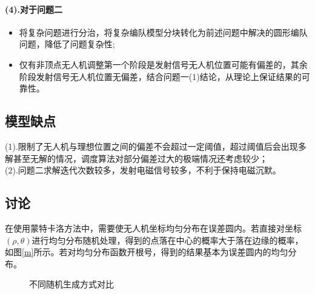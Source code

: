 \documentclass[withoutpreface,bwprint]{cumcmthesis} %
\begin{document}
	\paragraph{(4).对于问题二}
	\begin{itemize}
		\item 将复杂问题进行分治，将复杂编队模型分块转化为前述问题中解决的圆形编队问题，降低了问题复杂性;
		\item 仅有非顶点无人机调整第一个阶段是发射信号无人机位置可能有偏差的，其余阶段发射信号无人机位置无偏差，结合问题一(1)结论，从理论上保证结果的可靠性。
	\end{itemize}
	\subsection{模型缺点}
	(1).限制了无人机与理想位置之间的偏差不会超过一定阈值，超过阈值后会出现多解甚至无解的情况，调度算法对部分偏差过大的极端情况还考虑较少；\\
	(2).问题二求解迭代次数较多，发射电磁信号较多，不利于保持电磁沉默。
	
	\subsection{讨论}
	在使用蒙特卡洛方法中，需要使无人机坐标均匀分布在误差圆内。若直接对坐标$(\rho,\theta)$进行均匀分布随机处理，得到的点落在中心的概率大于落在边缘的概率，如图\ref{m}所示。若对均匀分布函数开根号，得到的结果基本为误差圆内的均匀分布。
	\begin{figure}[H]
		\centering
		\caption{不同随机生成方式对比}
		\label{fig meta}
	\end{figure}
	
	
\end{document}
